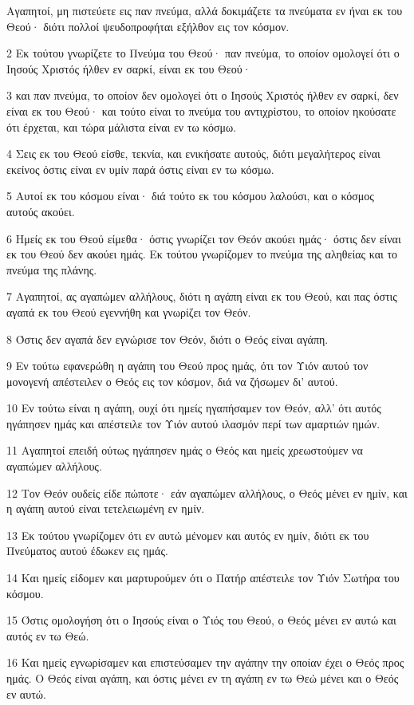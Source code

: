 \par Αγαπητοί, μη πιστεύετε εις παν πνεύμα, αλλά δοκιμάζετε τα πνεύματα εν ήναι εκ του Θεού· διότι πολλοί ψευδοπροφήται εξήλθον εις τον κόσμον.
\par 2 Εκ τούτου γνωρίζετε το Πνεύμα του Θεού· παν πνεύμα, το οποίον ομολογεί ότι ο Ιησούς Χριστός ήλθεν εν σαρκί, είναι εκ του Θεού·
\par 3 και παν πνεύμα, το οποίον δεν ομολογεί ότι ο Ιησούς Χριστός ήλθεν εν σαρκί, δεν είναι εκ του Θεού· και τούτο είναι το πνεύμα του αντιχρίστου, το οποίον ηκούσατε ότι έρχεται, και τώρα μάλιστα είναι εν τω κόσμω.
\par 4 Σεις εκ του Θεού είσθε, τεκνία, και ενικήσατε αυτούς, διότι μεγαλήτερος είναι εκείνος όστις είναι εν υμίν παρά όστις είναι εν τω κόσμω.
\par 5 Αυτοί εκ του κόσμου είναι· διά τούτο εκ του κόσμου λαλούσι, και ο κόσμος αυτούς ακούει.
\par 6 Ημείς εκ του Θεού είμεθα· όστις γνωρίζει τον Θεόν ακούει ημάς· όστις δεν είναι εκ του Θεού δεν ακούει ημάς. Εκ τούτου γνωρίζομεν το πνεύμα της αληθείας και το πνεύμα της πλάνης.
\par 7 Αγαπητοί, ας αγαπώμεν αλλήλους, διότι η αγάπη είναι εκ του Θεού, και πας όστις αγαπά εκ του Θεού εγεννήθη και γνωρίζει τον Θεόν.
\par 8 Όστις δεν αγαπά δεν εγνώρισε τον Θεόν, διότι ο Θεός είναι αγάπη.
\par 9 Εν τούτω εφανερώθη η αγάπη του Θεού προς ημάς, ότι τον Υιόν αυτού τον μονογενή απέστειλεν ο Θεός εις τον κόσμον, διά να ζήσωμεν δι' αυτού.
\par 10 Εν τούτω είναι η αγάπη, ουχί ότι ημείς ηγαπήσαμεν τον Θεόν, αλλ' ότι αυτός ηγάπησεν ημάς και απέστειλε τον Υιόν αυτού ιλασμόν περί των αμαρτιών ημών.
\par 11 Αγαπητοί επειδή ούτως ηγάπησεν ημάς ο Θεός και ημείς χρεωστούμεν να αγαπώμεν αλλήλους.
\par 12 Τον Θεόν ουδείς είδε πώποτε· εάν αγαπώμεν αλλήλους, ο Θεός μένει εν ημίν, και η αγάπη αυτού είναι τετελειωμένη εν ημίν.
\par 13 Εκ τούτου γνωρίζομεν ότι εν αυτώ μένομεν και αυτός εν ημίν, διότι εκ του Πνεύματος αυτού έδωκεν εις ημάς.
\par 14 Και ημείς είδομεν και μαρτυρούμεν ότι ο Πατήρ απέστειλε τον Υιόν Σωτήρα του κόσμου.
\par 15 Όστις ομολογήση ότι ο Ιησούς είναι ο Υιός του Θεού, ο Θεός μένει εν αυτώ και αυτός εν τω Θεώ.
\par 16 Και ημείς εγνωρίσαμεν και επιστεύσαμεν την αγάπην την οποίαν έχει ο Θεός προς ημάς. Ο Θεός είναι αγάπη, και όστις μένει εν τη αγάπη εν τω Θεώ μένει και ο Θεός εν αυτώ.
